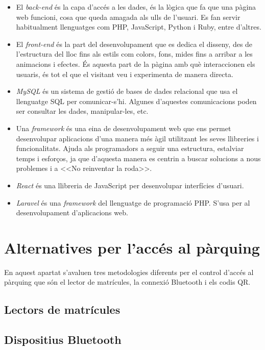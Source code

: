 \begin{itemize}
    \item El \emph{back-end} és la capa d'accés a les dades, és la lògica que fa que una pàgina web funcioni,
    cosa que queda amagada als ulls de l'usuari. Es fan servir habitualment llenguatges com PHP, JavaScript,
    Python i Ruby, entre d'altres.
    \item El \emph{front-end} és la part del desenvolupament que es dedica el disseny,
    des de l'estructura del lloc fins als estils com colors, fons, mides fins a arribar a les animacions i efectes.
    És aquesta part de la pàgina amb què interaccionen els usuaris, és tot el que el visitant veu i experimenta
    de manera directa.
    \item \emph{MySQL} és un sistema de gestió de bases de dades relacional que usa el llenguatge SQL per comunicar-s'hi. Algunes
    d'aquestes comunicacions poden ser consultar les dades, manipular-les, etc.
    \item Una \emph{framework} és una eina de desenvolupament web que ens permet desenvolupar aplicacions d'una
    manera més àgil utilitzant les seves llibreries i funcionalitats. Ajuda als programadors a seguir una estructura,
    estalviar temps i esforços, ja que d'aquesta manera es centrin a buscar solucions a nous problemes i a <<No reinventar la roda>>.
    \item \emph{React} \autocite{react} és una llibreria de JavaScript per desenvolupar interfícies d'usuari.
    \item \emph{Laravel} \autocite{laravel} és una \emph{framework} del llenguatge de programació PHP.
    S'usa per al desenvolupament d'aplicacions web.
\end{itemize}

\newpage
\section{Alternatives per l'accés al pàrquing}
\label{sec:alternatives}

En aquest apartat s'avaluen tres metodologies
diferents per el control d'accés al pàrquing que són el lector de
matrícules, la connexió Bluetooth i els codis QR.

\subsection{Lectors de matrícules}


\newpage
\subsection{Dispositius Bluetooth}


